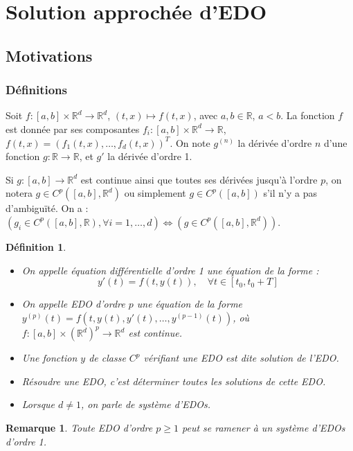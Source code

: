 \documentclass{article}
\newtheorem{definition}{Définition}
\newtheorem{remark}{Remarque}
\begin{document}
\sloppy

\section{Solution approchée d'EDO} %

\subsection{Motivations} %

\subsubsection{Définitions} %
Soit $f: [a, b] \times \mathbb{R}^d \to \mathbb{R}^d$, $(t, x) \mapsto f(t, x)$, avec $a, b \in \mathbb{R}$, $a < b$.
La fonction $f$ est donnée par ses composantes $f_i: [a, b] \times \mathbb{R}^d \to \mathbb{R}$, $f(t,x) = (f_1(t,x), \dots, f_d(t,x))^T$.
On note $g^{(n)}$ la dérivée d'ordre $n$ d'une fonction $g: \mathbb{R} \to \mathbb{R}$, et $g'$ la dérivée d'ordre 1.

Si $g: [a, b] \to \mathbb{R}^d$ est continue ainsi que toutes ses dérivées jusqu'à l'ordre $p$, on notera $g \in C^p([a, b], \mathbb{R}^d)$ ou simplement $g \in C^p([a, b])$ s'il n'y a pas d'ambiguïté.
On a : $(g_i \in C^p([a, b], \mathbb{R}), \forall i=1, \dots, d) \iff (g \in C^p([a, b], \mathbb{R}^d))$.

\begin{definition}
\begin{itemize}
    \item On appelle équation différentielle d'ordre 1 une équation de la forme :
    \[ y'(t) = f(t, y(t)), \quad \forall t \in [t_0, t_0 + T] \]
    \item On appelle EDO d'ordre $p$ une équation de la forme $y^{(p)}(t) = f(t, y(t), y'(t), \dots, y^{(p-1)}(t))$, où $f: [a, b] \times (\mathbb{R}^d)^p \to \mathbb{R}^d$ est continue.
    \item Une fonction $y$ de classe $C^p$ vérifiant une EDO est dite solution de l'EDO.
    \item Résoudre une EDO, c'est déterminer toutes les solutions de cette EDO.
    \item Lorsque $d \ne 1$, on parle de système d'EDOs.
\end{itemize}
\end{definition}

\begin{remark}
Toute EDO d'ordre $p \ge 1$ peut se ramener à un système d'EDOs d'ordre 1.
\end{remark}
\end{document}
